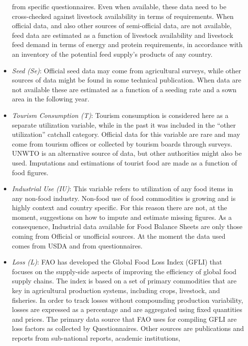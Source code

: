 \documentclass[]{article}
\begin{document}
\begin{itemize}
  from specific questionnaires. Even when available, these data need to
  be cross-checked against livestock availability in terms of
  requirements. When official data, and also other sources of
  semi-official data, are not available, feed data are estimated as a
  function of livestock availability and livestock feed demand in terms
  of energy and protein requirements, in accordance with an inventory of
  the potential feed supply's products of any country.
\item
  \emph{Seed (Se)}: Official seed data may come from agricultural
  surveys, while other sources of data might be found in some technical
  publication. When data are not available these are estimated as a
  function of a seeding rate and a sown area in the following year.
\item
  \emph{Tourism Consumption (T)}: Tourism consumption is considered here
  as a separate utilization variable, while in the past it was included
  in the ``other utilization'' catchall category. Official data for this
  variable are rare and may come from tourism offices or collected by
  tourism boards through surveys. UNWTO is an alternative source of
  data, but other authorities might also be used. Imputations and
  estimations of tourist food are made as a function of food figures.
\item
  \emph{Industrial Use (IU)}: This variable refers to utilization of any
  food items in any non-food industry. Non-food use of food commodities
  is growing and is highly context and country specific. For this reason
  there are not, at the moment, suggestions on how to impute and
  estimate missing figures. As a consequence, Industrial data available
  for Food Balance Sheets are only those coming from Official or
  unofficial sources. At the moment the data used comes from USDA and
  from questionnaires.
\item
  \emph{Loss (L)}: FAO has developed the Global Food Loss Index (GFLI)
  that focuses on the supply-side aspects of improving the efficiency of
  global food supply chains. The index is based on a set of primary
  commodities that are key in agricultural production systems, including
  crops, livestock, and fisheries. In order to track losses without
  compounding production variability, losses are expressed as a
  percentage and are aggregated using fixed quantities and prices. The
  primary data source that FAO uses for compiling GFLI are loss factors
  as collected by Questionnaires. Other sources are publications and
  reports from sub-national reports, academic institutions,

\end{itemize}
\end{document}
